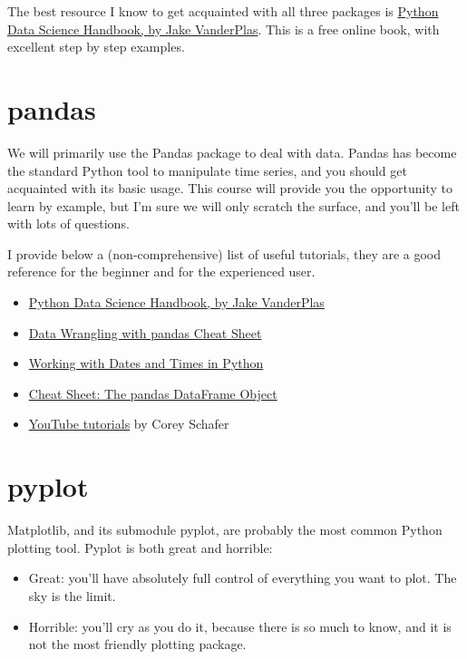 \documentclass[
  letterpaper,
  DIV=11,
  numbers=noendperiod,
  oneside]{scrreprt}
\providecommand{\tightlist}{%
  \setlength{\itemsep}{0pt}\setlength{\parskip}{0pt}}\usepackage{longtable,booktabs,array}
\begin{document}
The best resource I know to get acquainted with all three packages is
\href{https://jakevdp.github.io/PythonDataScienceHandbook/index.html}{Python
Data Science Handbook, by Jake VanderPlas}. This is a free online book,
with excellent step by step examples.

\hypertarget{pandas}{%
\section{pandas}\label{pandas}}

We will primarily use the Pandas package to deal with data. Pandas has
become the standard Python tool to manipulate time series, and you
should get acquainted with its basic usage. This course will provide you
the opportunity to learn by example, but I'm sure we will only scratch
the surface, and you'll be left with lots of questions.

I provide below a (non-comprehensive) list of useful tutorials, they are
a good reference for the beginner and for the experienced user.

\begin{itemize}
\tightlist
\item
  \href{https://jakevdp.github.io/PythonDataScienceHandbook/index.html}{Python
  Data Science Handbook, by Jake VanderPlas}
\item
  \href{https://pandas.pydata.org/Pandas_Cheat_Sheet.pdf}{Data Wrangling
  with pandas Cheat Sheet}
\item
  \href{https://images.datacamp.com/image/upload/v1666944896/Marketing/Blog/Working_with_Dates_and_Times_Cheat_Sheet.pdf}{Working
  with Dates and Times in Python}
\item
  \href{https://www.webpages.uidaho.edu/~stevel/cheatsheets/Pandas\%20DataFrame\%20Notes_12pages.pdf}{Cheat
  Sheet: The pandas DataFrame Object}
\item
  \href{https://www.youtube.com/watch?v=ZyhVh-qRZPA\&list=PL-osiE80TeTsWmV9i9c58mdDCSskIFdDS\&pp=iAQB}{YouTube
  tutorials} by Corey Schafer
\end{itemize}

\hypertarget{pyplot}{%
\section{pyplot}\label{pyplot}}

Matplotlib, and its submodule pyplot, are probably the most common
Python plotting tool. Pyplot is both great and horrible:

\begin{itemize}
\tightlist
\item
  Great: you'll have absolutely full control of everything you want to
  plot. The sky is the limit.
\item
  Horrible: you'll cry as you do it, because there is so much to know,
  and it is not the most friendly plotting package.
\end{itemize}
\end{document}
